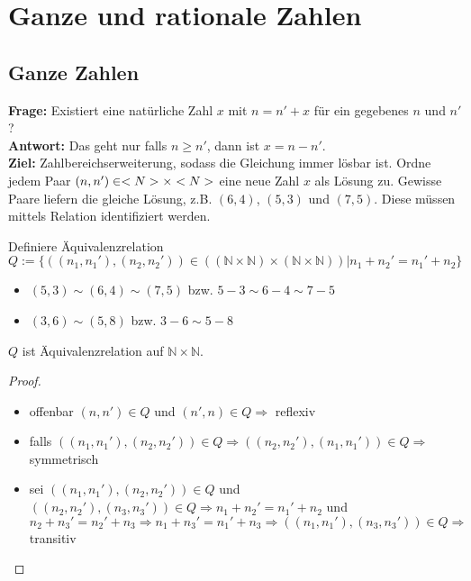 \section{Ganze und rationale Zahlen}
\subsection{Ganze Zahlen}
\textbf{Frage:} Existiert eine natürliche Zahl $x$ mit $n=n'+x$ für ein gegebenes $n$ und $n'$? \\
\textbf{Antwort:} Das geht nur falls $n\ge n'$, dann ist $x=n-n'$. \\
\textbf{Ziel:} Zahlbereichserweiterung, sodass die Gleichung immer lösbar ist. Ordne jedem Paar 
$(n,n')\in<N>\times<N>$ eine neue Zahl $x$ als Lösung zu. Gewisse Paare liefern die gleiche 
Lösung, z.B. $(6,4)$, $(5,3)$ und $(7,5)$. Diese müssen mittels Relation identifiziert werden.

\begin{*definition}
	Definiere Äquivalenzrelation $Q:=\{ ((n_1,n_1'),(n_2,n_2'))\in((\mathbb{N}\times\mathbb{N})\times(\mathbb{N}\times\mathbb{N})) | n_1+n_2' = n_1' + n_2 \}$
\end{*definition}

\begin{example}
	\begin{itemize}
		\item $(5,3)\sim (6,4) \sim (7,5)$ bzw. $5-3\sim 6-4\sim 7-5$
		\item $(3,6)\sim (5,8)$ bzw. $3-6\sim 5-8$
	\end{itemize}
\end{example}

\begin{proposition}
	$Q$ ist Äquivalenzrelation auf $\mathbb{N}\times\mathbb{N}$.
\end{proposition}
\begin{proof}
	\begin{itemize}
		\item offenbar $(n,n')\in Q$ und $(n',n)\in Q\Rightarrow$ reflexiv
		\item falls $((n_1,n_1'),(n_2,n_2'))\in Q\Rightarrow ((n_2,n_2'),(n_1,n_1'))\in Q\Rightarrow$ symmetrisch
		\item sei $((n_1,n_1'),(n_2,n_2'))\in Q$ und $((n_2,n_2'),(n_3,n_3'))\in Q\Rightarrow n_1+n_2'=n_1'+n_2$ und $n_2+n_3'=n_2'+n_3\Rightarrow n_1+n_3'=n_1'+n_3\Rightarrow ((n_1,n_1'),(n_3,n_3'))\in Q\Rightarrow$ transitiv
	\end{itemize}
\end{proof}

